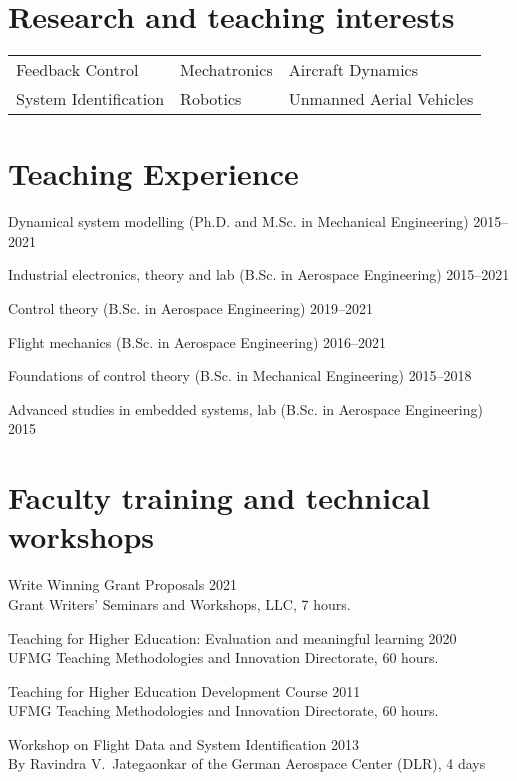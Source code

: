\documentclass[letterpaper, 11pt, oneside]{memoir}
\begin{document}
\section{Research and teaching interests}
\begin{tabular}{lll}
  
  Feedback Control & Mechatronics & Aircraft Dynamics
  \\
  System Identification & Robotics & Unmanned Aerial Vehicles
\end{tabular}

\section{Teaching Experience}
\begin{description}
\item 
{Dynamical system modelling (Ph.D. and M.Sc. in Mechanical Engineering)} \hfill {2015--2021}
\item 
{Industrial electronics, theory and lab (B.Sc. in Aerospace Engineering)} \hfill {2015--2021}
\item {Control theory (B.Sc. in Aerospace Engineering)} \hfill {2019--2021}
\item {Flight mechanics (B.Sc. in Aerospace Engineering)} \hfill {2016--2021}
\item {Foundations of control theory (B.Sc. in Mechanical Engineering)} \hfill {2015--2018}
\item 
{Advanced studies in embedded systems, lab (B.Sc. in Aerospace Engineering)} \hfill {2015}
\end{description}

\clearpage
\section{Faculty training and technical workshops}
\begin{description}
\item Write Winning Grant Proposals \hfill 2021
  \\
  Grant Writers' Seminars and Workshops, LLC, 7 hours.
\item Teaching for Higher Education: Evaluation and meaningful learning
  \hfill 2020
  \\
  UFMG Teaching Methodologies and Innovation Directorate, 60 hours.
\item Teaching for Higher Education Development Course \hfill 2011
  \\
  UFMG Teaching Methodologies and Innovation Directorate, 60 hours.
\item Workshop on Flight Data and System Identification \hfill 2013
  \\
  By Ravindra V.~Jategaonkar of the German Aerospace Center (DLR), 4 days
\end{description}
\end{document}
